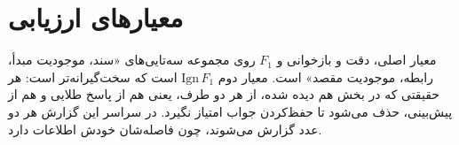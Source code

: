 \section{معیارهای ارزیابی}
\label{sec:metrics}

معیار اصلی، دقت و بازخوانی و $F_1$ روی مجموعه سه‌تایی‌های «سند، موجودیت مبدأ، رابطه، موجودیت مقصد» است. معیار دوم $\mathrm{Ign}\,F_1$ است که سخت‌گیرانه‌تر است: هر حقیقتی که در بخش  هم دیده شده، از هر دو طرف، یعنی هم از پاسخ طلایی و هم از پیش‌بینی، حذف می‌شود تا حفظ‌کردن جواب امتیاز نگیرد. در سراسر این گزارش هر دو عدد گزارش می‌شوند، چون فاصله‌شان خودش اطلاعات دارد.
